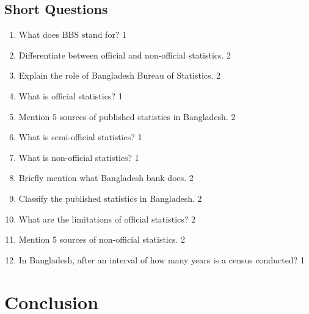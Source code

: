 \documentclass[a4paper,oneside]{book}
\begin{document}
 
 \section{Short Questions}
 \begin{enumerate}

    \item What does BBS stand for?  \hfill 1
    \item Differentiate between official and non-official statistics. \hfill 2
    \item Explain the role of Bangladesh Bureau of Statistics. \hfill 2
    \item What is official statistics?  \hfill 1
    \item Mention 5 sources of published statistics in Bangladesh. \hfill 2
    \item What is semi-official statistics?  \hfill 1
    \item What is non-official statistics?  \hfill 1
    \item Briefly mention what Bangladesh bank does.  \hfill 2
    \item Classify the published statistics in Bangladesh. \hfill 2
    \item What are the limitations of official statistics? \hfill 2
    \item Mention 5 sources of non-official statistics. \hfill 2
    \item In Bangladesh, after an interval of how many years is a census 
    conducted?  \hfill 1
    
    \end{enumerate}

\backmatter
\chapter{Conclusion}
\lipsum[8]

\tableofcontents
\end{document}
